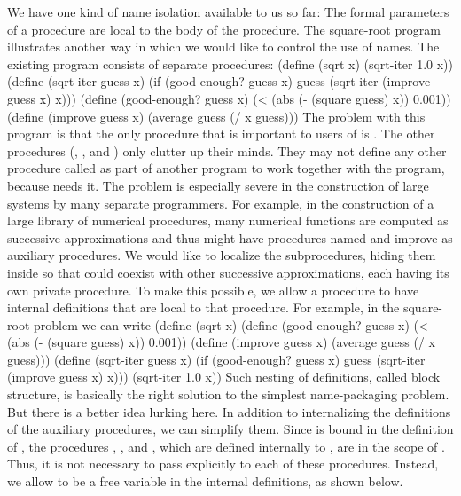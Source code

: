 We have one kind of name isolation available to us so far:
The formal parameters of a procedure are local to the body of the procedure.
The square-root program illustrates another way in which we would like to control the use of names.
The existing program consists of separate procedures:
\startcode
(define (sqrt x)
  (sqrt-iter 1.0 x))
(define (sqrt-iter guess x)
  (if (good-enough? guess x)
      guess
      (sqrt-iter (improve guess x) x)))
(define (good-enough? guess x)
  (< (abs (- (square guess) x)) 0.001))
(define (improve guess x)
  (average guess (/ x guess)))
\stopcode
The problem with this program is that the only procedure that is important to users of  is .
The other procedures (, , and ) only clutter up their minds.
They may not define any other procedure called  as part of
another program to work together with the  program,
because  needs it.
The problem is especially severe in the construction of large systems by many separate programmers.
For example, in the construction of a large library of numerical procedures,
many numerical functions are computed as successive approximations
and thus might have procedures named  and improve as auxiliary procedures.
We would like to localize the subprocedures,
hiding them inside  so that  could coexist with other successive approximations,
each having its own private  procedure.
To make this possible, we allow a procedure to have internal definitions that are local to that procedure.
For example, in the square-root problem we can write
\startcode
(define (sqrt x)
  (define (good-enough? guess x)
    (< (abs (- (square guess) x)) 0.001))
  (define (improve guess x)
    (average guess (/ x guess)))
  (define (sqrt-iter guess x)
    (if (good-enough? guess x)
        guess
        (sqrt-iter (improve guess x) x)))
  (sqrt-iter 1.0 x))
\stopcode
Such nesting of definitions, called block structure,
is basically the right solution to the simplest name-packaging problem.
But there is a better idea lurking here.
In addition to internalizing the definitions of the auxiliary procedures, we can simplify them.
Since  is bound in the definition of ,
the procedures , , and , which are defined internally to ,
are in the scope of .
Thus, it is not necessary to pass  explicitly to each of these procedures.
Instead, we allow  to be a free variable in the internal definitions, as shown below.
